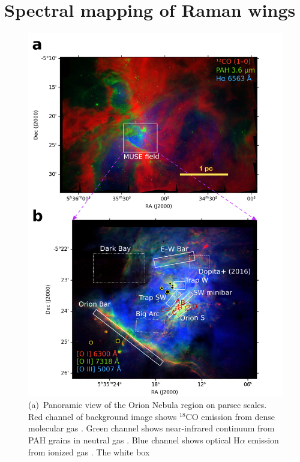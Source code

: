 \documentclass[useAMS, usenatbib, a4paper]{mnras}
\newcommand*\chem[1]{\ensuremath{\mathrm{#1}}}
\begin{document}
\section{Spectral mapping of Raman wings}
\label{sec:muse-spectr-mapp}
\begin{figure}
  \centering
  \includegraphics[width=\linewidth]{figs/raman-fov-regions}
  \caption{(a)~Panoramic view of the Orion Nebula region on parsec
    scales.  Red channel of background image shows \chem{^{18}CO}
    emission from dense molecular gas \citetext{Carma-NRO Orion
      Survey, \citealp{Kong:2018a}}. Green channel shows near-infrared
    continuum from PAH grains in neutral gas \citetext{Spitzer Orion
      Survey, \citealp{Megeath:2012a}}.  Blue channel shows optical
    H\(\alpha\) emission from ionized gas \citetext{WFI camera on ESO
      \SI{2.2}{m} La Silla, \citealp{Da-Rio:2009a}}. The white box
}
\end{figure}
\end{document}
